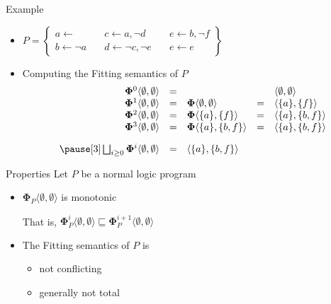 \begin{frame}{Example}
  \bigskip
  \begin{itemize}
  \item<1->
    \(
    P
    =
    \left\{
      \begin{array}{lll}
        a \leftarrow                \quad &
        c \leftarrow a, \neg d      \quad &
        e \leftarrow b, \neg f
        \\
        b \leftarrow \neg a         \quad &
        d \leftarrow \neg c, \neg e \quad &
        e \leftarrow e
      \end{array}
    \right\}
    \)
  \bigskip
  \item<2-> Computing the Fitting semantics of $P$
    \[
    \begin{array}{rclcl}
      \mathbf{\Phi}^0\langle\emptyset,\emptyset\rangle&=&                                              & &\langle\emptyset,\emptyset\rangle
      \\
      \mathbf{\Phi}^1\langle\emptyset,\emptyset\rangle&=&\mathbf{\Phi}\langle\emptyset,\emptyset\rangle&=&\langle\{a\}    ,\{f\}    \rangle
      \\
      \mathbf{\Phi}^2\langle\emptyset,\emptyset\rangle&=&\mathbf{\Phi}\langle\{a\}    ,\{f\}    \rangle&=&\langle\{a\}    ,\{b,f\}  \rangle
      \\
      \mathbf{\Phi}^3\langle\emptyset,\emptyset\rangle&=&\mathbf{\Phi}\langle\{a\}    ,\{b,f\}  \rangle&=&\langle\{a\}    ,\{b,f\}  \rangle%
      \\[10pt]\pause[3]
      \bigsqcup_{i \geq 0}\mathbf{\Phi}^i\langle\emptyset,\emptyset\rangle&=&\langle \{a\}, \{b,f\} \rangle
    \end{array}
    \]
  \end{itemize}
\end{frame}
\begin{frame}{Properties}
  \bigskip
  Let $P$ be a normal logic program
  \medskip
  \begin{itemize}
  \item ${\mathbf{\Phi}}_P\langle \emptyset, \emptyset \rangle$ is monotonic
    \smallskip

    That is,
    \(
    {\mathbf{\Phi}}_P^i\langle \emptyset, \emptyset \rangle
    \sqsubseteq
    {\mathbf{\Phi}}_P^{i+1}\langle \emptyset, \emptyset \rangle
    \)
    \smallskip
  \item The Fitting semantics of $P$ is
    \begin{itemize}\normalsize
    \item not conflicting
    \item generally not total
    \end{itemize}
  \end{itemize}
\end{frame}
